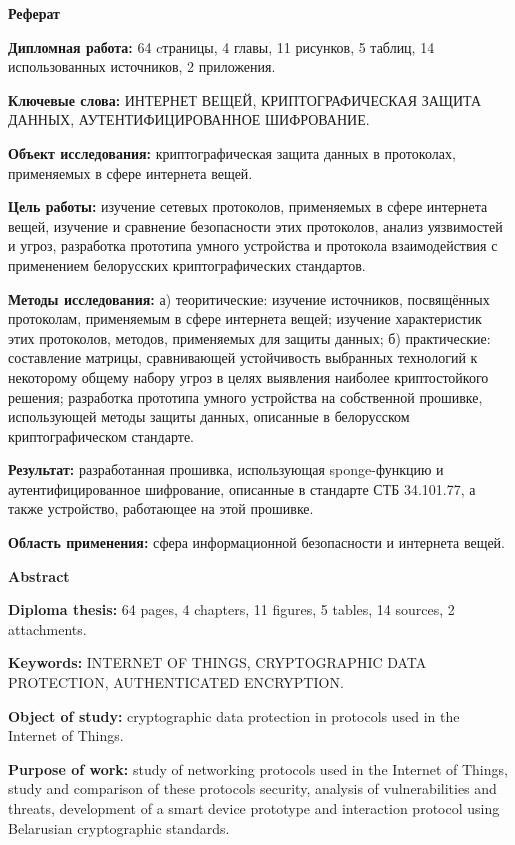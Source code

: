 \newpage
\begin{center}{\bf \Large Реферат}\end{center}
  
\textbf{Дипломная работа:} 64 cтраницы, 4 главы, 11 рисунков, 5 таблиц, 14 использованных источников,
2 приложения.

\textbf{Ключевые слова:} ИНТЕРНЕТ ВЕЩЕЙ, КРИПТОГРАФИЧЕСКАЯ ЗАЩИТА ДАННЫХ, 
АУТЕНТИФИЦИРОВАННОЕ ШИФРОВАНИЕ.

\textbf{Объект исследования:} криптографическая защита данных в протоколах, применяемых в сфере 
интернета вещей.

\textbf{Цель работы:} изучение сетевых протоколов, применяемых в сфере интернета вещей, изучение
и сравнение безопасности этих протоколов, анализ уязвимостей и угроз, разработка прототипа умного
устройства и протокола взаимодействия с применением белорусских криптографических стандартов.

\textbf{Методы исследования:} а) теоритические: изучение источников, посвящённых протоколам,
применяемым в сфере интернета вещей; изучение характеристик этих протоколов, методов, применяемых
для защиты данных; б) практические: составление матрицы, сравнивающей устойчивость выбранных 
технологий к некоторому общему набору угроз в целях выявления наиболее криптостойкого решения;
разработка прототипа умного устройства на собственной прошивке, использующей методы защиты
данных, описанные в белорусском криптографическом стандарте.

\textbf{Результат:} разработанная прошивка, использующая sponge-функцию и аутентифицированное
шифрование, описанные в стандарте СТБ 34.101.77, а также устройство, работающее на этой прошивке.

\textbf{Область применения:} сфера информационной безопасности и интернета вещей.


\newpage
\begin{center}{\bf \Large Abstract}\end{center}

\textbf{Diploma thesis:} 64 pages, 4 chapters, 11 figures, 5 tables, 14 sources, 2 attachments.

\textbf{Keywords:} INTERNET OF THINGS, CRYPTOGRAPHIC DATA \newline PROTECTION, 
AUTHENTICATED ENCRYPTION.

\textbf{Object of study:} cryptographic data protection in protocols used in the Internet of Things.

\textbf{Purpose of work:} study of networking protocols used in the Internet of Things, study and 
comparison of these protocols security, analysis of vulnerabilities and threats, development 
of a smart device prototype and interaction protocol using Belarusian cryptographic standards.

